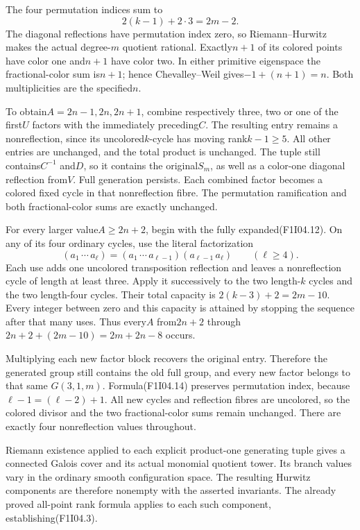 The four permutation indices sum to
\[
               2(k-1)+2\cdot3=2m-2.                 \tag{F1I04.13}
\]
The diagonal reflections have permutation index zero, so
Riemann--Hurwitz makes the actual degree-$m$ quotient
rational. Exactly$n+1$ of its colored points have color
one and$n+1$ have color two. In either primitive eigenspace
the fractional-color sum is$n+1$; hence Chevalley--Weil
gives$-1+(n+1)=n$. Both multiplicities are the specified$n$.

To obtain$A=2n-1,2n,2n+1$, combine respectively three,
two or one of the first$U$ factors with the immediately
preceding$C$. The resulting entry remains a nonreflection,
since its uncolored$k$-cycle has moving rank$k-1\ge5$.
All other entries are unchanged, and the total product
is unchanged. The tuple still contains$C^{-1}$ and$D$,
so it contains the original$S_m$, as well as a color-one
diagonal reflection from$V$. Full generation persists.
Each combined factor becomes a colored fixed cycle in
that nonreflection fibre. The permutation ramification
and both fractional-color sums are exactly unchanged.

For every larger value$A\ge2n+2$, begin with the fully
expanded(F1I04.12). On any of its four ordinary cycles,
use the literal factorization
\[
 (a_1\,\cdots\,a_\ell)
   =(a_1\,\cdots\,a_{\ell-1})(a_{\ell-1}\,a_\ell)
 \qquad(\ell\ge4).                                   \tag{F1I04.14}
\]
Each use adds one uncolored transposition reflection and
leaves a nonreflection cycle of length at least three.
Apply it successively to the two length-$k$ cycles and
the two length-four cycles. Their total capacity is
$2(k-3)+2=2m-10$. Every integer between zero and this
capacity is attained by stopping the sequence after that
many uses. Thus every$A$ from$2n+2$ through
$2n+2+(2m-10)=2m+2n-8$ occurs.

Multiplying each new factor block recovers the original
entry. Therefore the generated group still contains the
old full group, and every new factor belongs to that same
$G(3,1,m)$. Formula(F1I04.14) preserves permutation index,
because$\ell-1=(\ell-2)+1$. All new cycles and reflection
fibres are uncolored, so the colored divisor and the two
fractional-color sums remain unchanged. There are exactly
four nonreflection values throughout.

Riemann existence applied to each explicit product-one
generating tuple gives a connected Galois cover and its
actual monomial quotient tower. Its branch values vary
in the ordinary smooth configuration space. The resulting
Hurwitz components are therefore nonempty with the asserted
invariants. The already proved all-point rank formula
applies to each such component, establishing(F1I04.3).

